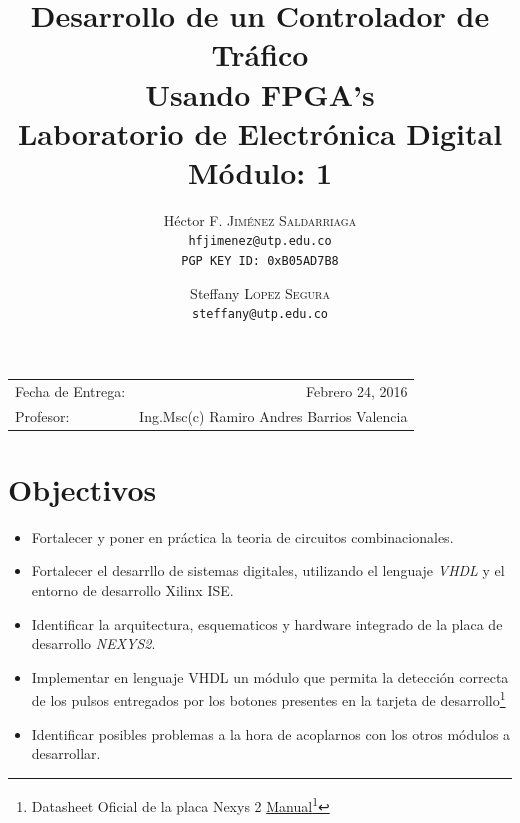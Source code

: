 \documentclass[paper=a4, fontsize=12pt]{article} 		%
\title{Desarrollo de un Controlador de Tráfico\\ 
Usando FPGA's \\
Laboratorio de Electrónica Digital\\Módulo: 1} 			%
\author{
Héctor F. \textsc{Jiménez Saldarriaga}\\
\texttt{hfjimenez@utp.edu.co} \\
\texttt{PGP KEY ID: 0xB05AD7B8}
\and
Steffany \textsc{Lopez Segura}\\
\texttt{steffany@utp.edu.co}
}        %
\date{}    						                       %
\newcommand\fnurl[2]{%
\href{#2}{#1}\footnote{\url{#2}}%
}
\numberwithin{equation}{section}						%
\numberwithin{figure}{section} 							%
\numberwithin{table}{section} 							%
\begin{document}
\maketitle                      			           %
\begin{center}
\begin{tabular}{l r}
Fecha de Entrega: & Febrero 24, 2016 \\				   %
Profesor: & Ing.Msc(c) Ramiro Andres Barrios Valencia
\end{tabular}
\end{center}
\section{Objectivos}
\begin{itemize}
  \item Fortalecer y poner en práctica la teoria de circuitos combinacionales.
  \item Fortalecer el desarrllo de sistemas digitales, utilizando el lenguaje \emph{VHDL} y el entorno de desarrollo Xilinx ISE.
  \item Identificar la arquitectura, esquematicos y hardware integrado de la placa de desarrollo \emph{NEXYS2}.
  \item Implementar en lenguaje VHDL un módulo que permita la detección correcta de los pulsos entregados por los botones presentes en la tarjeta de desarrollo\footnote{Datasheet Oficial de la placa  Nexys 2 \fnurl{Manual}{http://reference.digilentinc.com/_media/nexys:nexys2:nexys2_rm.pdf}}
  \item Identificar posibles problemas a la hora de acoplarnos con los otros módulos a desarrollar.
\end{itemize}

\end{document}
